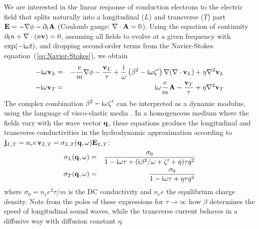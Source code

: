 \documentclass[11pt, oneside]{article}   	%
\begin{document}
We are interested in the linear response of conduction electrons to the electric field
that splits naturally into a longitudinal ($L$) and transverse ($T$) part
${\bf E} = - \nabla \phi - \partial_t {\bf A}$ (Coulomb gauge: $\nabla \cdot {\bf A} = 0$).
Using the equation of continuity $\partial_t n + \nabla \cdot( n {\bf v} ) = 0$,
assuming all fields to evolve at a given frequency with $\exp( - {\rm i}\omega t)$, 
and dropping second-order terms from the Navier-Stokes equation~(\ref{eq:Navier-Stokes}),
we obtain
\begin{eqnarray}
- {\rm i} \omega {\bf v}_{L} &=& - \frac{e}{m} \nabla \phi - \frac{ {\bf v}_{L} }{ \tau } 
+ \frac{ {\rm i} }{ \omega } \left( \beta^2 - {\rm i}\omega \zeta' \right) \nabla (\nabla \cdot {\bf v}_{L}) + \eta \nabla^2 {\bf v}_{L}
\label{eq:longitudinal-linear-response}
\\
- {\rm i} \omega {\bf v}_T &=& {\rm i} \omega \frac{e}{m} {\bf A} - \frac{ {\bf v}_T }{ \tau } 
+ \eta \nabla^2 {\bf v}_T
\label{eq:transverse-linear-response}
\end{eqnarray}
The complex combination $\beta^2 - {\rm i}\omega \zeta'$ can be interpreted as a dynamic
modulus, using the language of visco-elastic media \citep{Conti_1999}.
In a homogeneous medium where the fields vary with the wave vector ${\bf q}$, these equations 
produce the longitudinal and transverse conductivities in the hydrodynamic approximation
according to 
${\bf j}_{L,T} = n_e e \, {\bf v}_{L,T} = \sigma_{L,T}( {\bf q}, \omega ) {\bf E}_{L,T}$:
\begin{eqnarray}
\sigma_{L}({\bf q}, \omega) &=& 
\frac{ \sigma_0 }{
1 - {\rm i} \omega \tau + ({\rm i} \beta^2 / \omega + \zeta' + \eta) \tau q^2 }
\label{eq:hdyn-longitudinal-sigma}
\\
\sigma_T({\bf q}, \omega) &=& 
\frac{ \sigma_0 }{
1 - {\rm i} \omega \tau + \eta \tau q^2 }
\label{eq:hdyn-transverse-sigma}
\end{eqnarray}
where $\sigma_0 = n_e e^2 \tau / m$ is the DC conductivity 
and $n_e e$ the equilibrium charge density. Note from the poles of these expressions 
for $\tau \to \infty$ how $\beta$ determines the speed of longitudinal sound waves, 
while the transverse current behaves in a diffusive way with diffusion constant $\eta$. 
\end{document}
